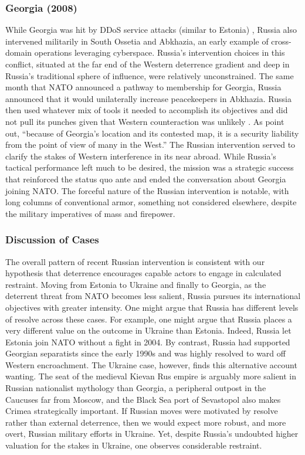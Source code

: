 \documentclass[11pt,letterpaper,pdftex,dvipsnames,table]{article}
\begin{document}
\subsubsection{Georgia (2008)}
While Georgia was hit by DDoS service attacks (similar to Estonia) \citep{deibert_cyclonescyberspaceinformation_2012}, Russia also intervened militarily in South Ossetia and Abkhazia, an early example of cross-domain operations leveraging cyberspace. Russia’s intervention choices in this conflict, situated at the far end of the Western deterrence gradient and deep in Russia's traditional sphere of influence, were relatively unconstrained. The same month that NATO announced a pathway to membership for Georgia, Russia announced that it would unilaterally increase peacekeepers in Abkhazia. Russia then used whatever mix of tools it needed to accomplish its objectives and did not pull its punches given that Western counteraction was unlikely \citep{binnendijk_understandingrussianblack_2020}. As \citet[590]{driscoll_friendsthesebrinkmanship_2016} point out, ``because of Georgia’s location and its contested map, it is a security liability from the point of view of many in the West.'' The Russian intervention served to clarify the stakes of Western interference in its near abroad. While Russia’s tactical performance left much to be desired, the mission was a strategic success that reinforced the status quo ante and ended the conversation about Georgia joining NATO. The forceful nature of the Russian intervention is notable, with long columns of conventional armor, something not considered elsewhere, despite the military imperatives of mass and firepower.

\subsubsection{Discussion of Cases}
The overall pattern of recent Russian intervention is consistent with our hypothesis that deterrence encourages capable actors to engage in calculated restraint. Moving from Estonia to Ukraine and finally to Georgia, as the deterrent threat from NATO becomes less salient, Russia pursues its international objectives with greater intensity. One might argue that Russia has different levels of resolve across these cases. For example, one might argue that Russia places a very different value on the outcome in Ukraine than Estonia. Indeed, Russia let Estonia join NATO without a fight in 2004. By contrast, Russia had supported Georgian separatists since the early 1990s and was highly resolved to ward off Western encroachment. The Ukraine case, however, finds this alternative account wanting. The seat of the medieval Kievan Rus empire is arguably more salient in Russian nationalist mythology than Georgia, a peripheral outpost in the Caucuses far from Moscow, and the Black Sea port of Sevastopol also makes Crimea strategically important. If Russian moves were motivated by resolve rather than external deterrence, then we would expect more robust, and more overt, Russian military efforts in Ukraine. Yet, despite Russia’s undoubted higher valuation for the stakes in Ukraine, one observes considerable restraint.
\end{document}
